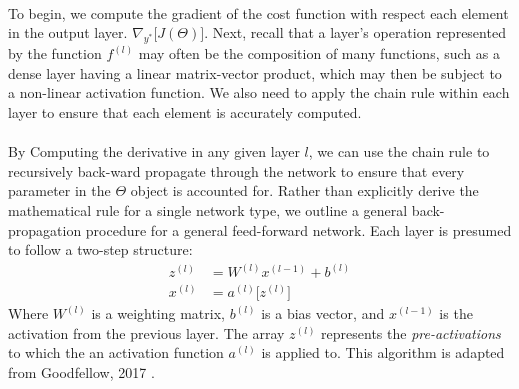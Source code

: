 \documentclass[12pt,letterpaper]{article}
\begin{document}
\paragraph*{}To begin, we compute the gradient of the cost function with respect each element in the output layer. $\nabla_{y^*}\big[J(\Theta)\big]$. Next, recall that a layer's operation represented by the function $f^{(l)}$ may often be the composition of many functions, such as a dense layer having a linear matrix-vector product, which may then be subject to a non-linear activation function. We also need to apply the chain rule within each layer to ensure that each element is accurately computed.

\paragraph*{}By Computing the derivative in any given layer $l$, we can use the chain rule to recursively back-ward propagate through the network to ensure that every parameter in the $\Theta$ object is accounted for. Rather than explicitly derive the mathematical rule for a single network type, we outline a general back-propagation procedure for a general feed-forward network. Each layer is presumed to follow a two-step structure:
\begin{equation}
\begin{split}
z^{(l)} &=  W^{(l)} x^{(l-1)} + b^{(l)} \\
x^{(l)} &= a^{(l)} \big[ z^{(l)} \big]
\end{split}
\end{equation}
Where $W^{(l)}$ is a weighting matrix, $b^{(l)}$ is a bias vector, and $x^{(l-1)}$ is the activation from the previous layer. The array $z^{(l)}$ represents the \textit{pre-activations} to which the an activation function $a^{(l)}$ is applied to. This algorithm is adapted from Goodfellow, 2017 \cite{Goodfellow}.
\end{document}
